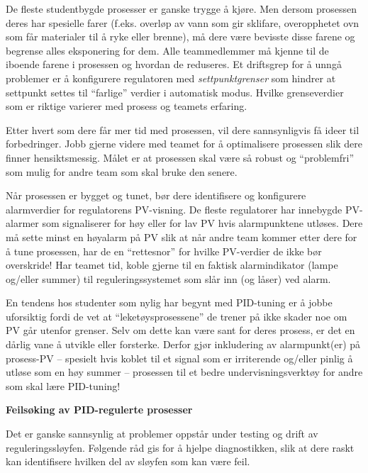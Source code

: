 \vskip 10pt

De fleste studentbygde prosesser er ganske trygge å kjøre. Men dersom prosessen deres har spesielle farer (f.eks. overløp av vann som gir sklifare, overopphetet ovn som får materialer til å ryke eller brenne), må dere være bevisste disse farene og begrense alles eksponering for dem. Alle teammedlemmer må kjenne til de iboende farene i prosessen og hvordan de reduseres. Et driftsgrep for å unngå problemer er å konfigurere regulatoren med {\it settpunktgrenser} som hindrer at settpunkt settes til ``farlige'' verdier i automatisk modus. Hvilke grenseverdier som er riktige varierer med prosess og teamets erfaring.

Etter hvert som dere får mer tid med prosessen, vil dere sannsynligvis få ideer til forbedringer. Jobb gjerne videre med teamet for å optimalisere prosessen slik dere finner hensiktsmessig. Målet er at prosessen skal være så robust og ``problemfri'' som mulig for andre team som skal bruke den senere.

\vskip 10pt

Når prosessen er bygget og tunet, bør dere identifisere og konfigurere alarmverdier for regulatorens PV-visning. De fleste regulatorer har innebygde PV-alarmer som signaliserer for høy eller for lav PV hvis alarmpunktene utløses. Dere må sette minst en høyalarm på PV slik at når andre team kommer etter dere for å tune prosessen, har de en ``rettesnor'' for hvilke PV-verdier de ikke bør overskride! Har teamet tid, koble gjerne til en faktisk alarmindikator (lampe og/eller summer) til reguleringssystemet som slår inn (og låser) ved alarm.

En tendens hos studenter som nylig har begynt med PID-tuning er å jobbe uforsiktig fordi de vet at ``leketøysprosessene'' de trener på ikke skader noe om PV går utenfor grenser. Selv om dette kan være sant for deres prosess, er det en dårlig vane å utvikle eller forsterke. Derfor gjør inkludering av alarmpunkt(er) på prosess-PV -- spesielt hvis koblet til et signal som er irriterende og/eller pinlig å utløse som en høy summer -- prosessen til et bedre undervisningsverktøy for andre som skal lære PID-tuning!


\vfil \eject

\centerline{\bf Feilsøking av PID-regulerte prosesser}

\vskip 10pt

Det er ganske sannsynlig at problemer oppstår under testing og drift av reguleringssløyfen. Følgende råd gis for å hjelpe diagnostikken, slik at dere raskt kan identifisere hvilken del av sløyfen som kan være feil.

